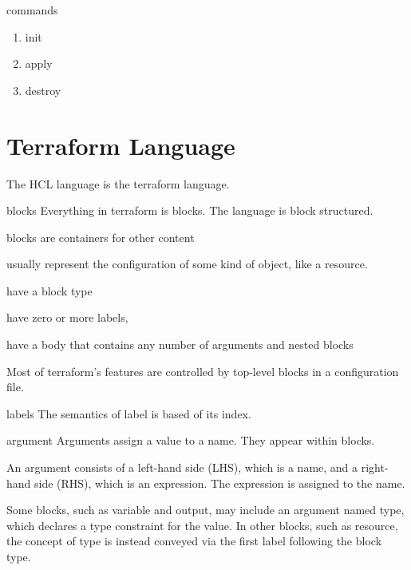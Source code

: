\documentclass[openany, 12pt]{book}
\begin{document}
\begin{definition}{commands}{}
	\begin{enumerate}[label = {(\arabic*)}]
		\item init
		\item apply
		\item destroy
	\end{enumerate}
\end{definition}

\chapter{Terraform Language}
The HCL language is the terraform language.

\begin{definition}{blocks}{}
	Everything in terraform is blocks. The language is block structured.

	\begin{alist}
		\item blocks are containers for other content
		\item usually represent the configuration of some kind of object, like a
		resource.
		\item have a block type
		\item have zero or more labels,
		\item have a body that contains any number of arguments and nested blocks
	\end{alist}
	Most of terraform's features are controlled by top-level blocks in a
	configuration file.

\end{definition}

\begin{definition}{labels}{}
	The semantics of label is based of its index.
\end{definition}

\begin{definition}{argument}{}
	Arguments assign a value to a name. They appear within blocks.

	An argument consists of a left-hand side (LHS), which is a name, and a
	right-hand side (RHS), which is an expression. The expression is assigned to
	the name.

	Some blocks, such as variable and output, may include an argument named
	type, which declares a type constraint for the value. In other blocks, such
	as resource, the concept of type is instead conveyed via the first label
	following the block type.
\end{definition}
\end{document}
